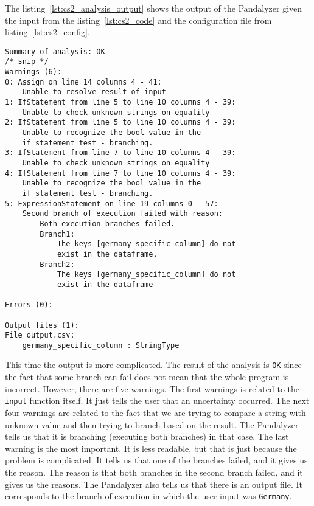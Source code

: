 The listing~\ref{lst:cs2_analysis_output} shows the output of the Pandalyzer given the input from the
listing~\ref{lst:cs2_code} and the configuration file from listing~\ref{lst:cs2_config}.

\begin{lstlisting}[caption=Analysis output of the second case study, label={lst:cs2_analysis_output}, captionpos=b]
Summary of analysis: OK
/* snip */
Warnings (6):
0: Assign on line 14 columns 4 - 41:
    Unable to resolve result of input
1: IfStatement from line 5 to line 10 columns 4 - 39:
    Unable to check unknown strings on equality
2: IfStatement from line 5 to line 10 columns 4 - 39:
    Unable to recognize the bool value in the
    if statement test - branching.
3: IfStatement from line 7 to line 10 columns 4 - 39:
    Unable to check unknown strings on equality
4: IfStatement from line 7 to line 10 columns 4 - 39:
    Unable to recognize the bool value in the
    if statement test - branching.
5: ExpressionStatement on line 19 columns 0 - 57:
    Second branch of execution failed with reason:
        Both execution branches failed.
        Branch1:
            The keys [germany_specific_column] do not
            exist in the dataframe,
        Branch2:
            The keys [germany_specific_column] do not
            exist in the dataframe

Errors (0):

Output files (1):
File output.csv:
    germany_specific_column : StringType

\end{lstlisting}

This time the output is more complicated.
The result of the analysis is \verb|OK| since the fact that some branch can fail does not mean that the whole program is
incorrect.
However, there are five warnings.
The first warnings is related to the \verb|input| function itself.
It just tells the user that an uncertainty occurred.
The next four warnings are related to the fact that we are trying to compare a string with unknown value and then
trying to branch based on the result.
The Pandalyzer tells us that it is branching (executing both branches) in that case.
The last warning is the most important.
It is less readable, but that is just because the problem is complicated.
It tells us that one of the branches failed, and it gives us the reason.
The reason is that both branches in the second branch failed, and it gives us the reasons.
The Pandalyzer also tells us that there is an output file.
It corresponds to the branch of execution in which the user input was \verb|Germany|.


